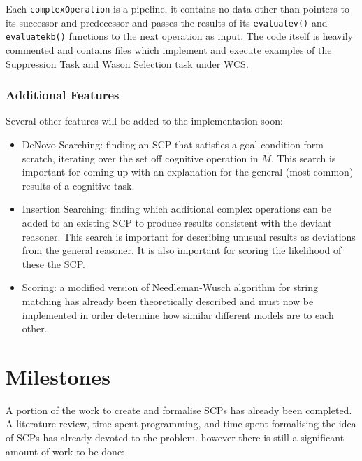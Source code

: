 \documentclass{article}
\begin{document}
Each \texttt{complexOperation} is a pipeline, it contains no data other than pointers to its successor and predecessor and passes the results of its \texttt{evaluatev()} and \texttt{evaluatekb()} functions to the next operation as input. The code itself is heavily commented and contains files which implement and execute examples of the Suppression Task and Wason Selection task under WCS.

\subsubsection{Additional Features}
Several other features will be added to the implementation soon:
\begin{itemize}
\item DeNovo Searching: finding an SCP that satisfies a goal condition form scratch, iterating over the set off cognitive operation in $M$. This search is important for coming up with an explanation for the general (most common) results of a cognitive task.
\item Insertion Searching: finding which additional complex operations can be added to an existing SCP to produce results consistent with the deviant reasoner. This search is important for describing unusual results as deviations from the general reasoner. It is also important for scoring the likelihood of these the SCP.
\item Scoring: a modified version of Needleman-Wusch algorithm for string matching has already been theoretically described and must now be implemented in order determine how similar different models are to each other.
\end{itemize}
\newpage

\section{Milestones}
A portion of the work to create and formalise SCPs has already been completed. A literature review, time spent programming, and time spent formalising the idea of SCPs has already devoted to the problem. however there is still a significant amount of work to be done:
\end{document}
